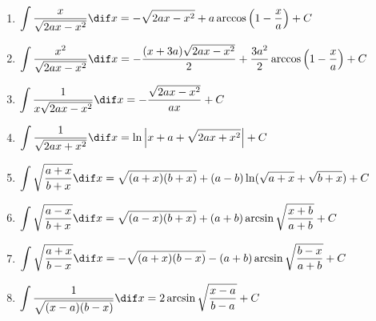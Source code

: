 \begin{enumerate}[1.,itemsep=5pt,resume]
  \item $\displaystyle \int \frac{x}{\sqrt{2ax-x^2}}\dif x =-\sqrt{2ax-x^2}+a\arccos\left(1-\frac{x}{a}\right) +C$
  \item $\displaystyle \int \frac{x^2}{\sqrt{2ax-x^2}}\dif x =-\frac{(x+3a)\sqrt{2ax-x^2}}{2}+\frac{3a^2}{2}\arccos\left(1-\frac{x}{a}\right) +C$
  \item $\displaystyle \int \frac{1}{x\sqrt{2ax-x^2}}\dif x = -\frac{\sqrt{2ax-x^2}}{ax} +C$
  \item $\displaystyle \int \frac{1}{\sqrt{2ax+x^2}}\dif x = \ln\left|x+a+\sqrt{2ax+x^2}\right| +C$
  \item $\displaystyle \int \sqrt{\frac{a+x}{b+x}}\dif x = \sqrt{(a+x)(b+x)}+(a-b)\ln(\sqrt{a+x}+\sqrt{b+x})+C$
  \item $\displaystyle \int \sqrt{\frac{a-x}{b+x}}\dif x =\sqrt{(a-x)(b+x)}+(a+b)\arcsin\sqrt{\frac{x+b}{a+b}} +C$
  \item $\displaystyle \int \sqrt{\frac{a+x}{b-x}}\dif x =-\sqrt{(a+x)(b-x)}-(a+b)\arcsin\sqrt{\frac{b-x}{a+b}} +C$
  \item $\displaystyle \int \frac{1}{\sqrt{(x-a)(b-x)}}\dif x =2\arcsin\sqrt{\frac{x-a}{b-a}} +C$
\end{enumerate}
